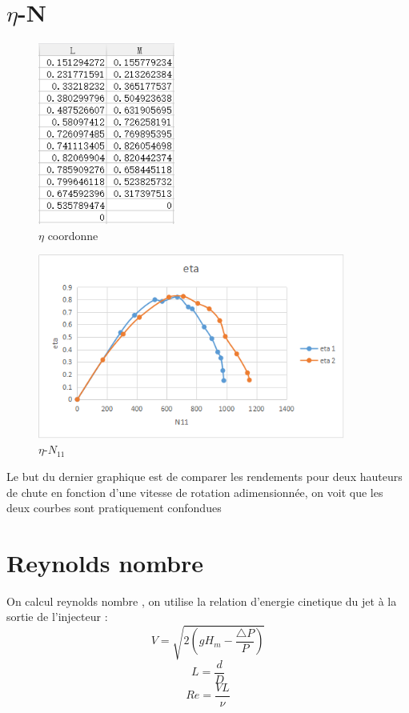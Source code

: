 \documentclass[a4paper,10pt]{report} %
\begin{document}
\section{$\eta$-N}
\begin{figure}[h!]
\centering
\includegraphics[width=0.4\textwidth]{fig/figure11.png}
\caption{$\eta$ coordonne}
\end{figure}\begin{figure}[h!]
\centering
\includegraphics[width=0.9\textwidth]{fig/figure12.png}
\caption{$\eta$-$N_{11}$}
\end{figure}
Le but du dernier graphique est de comparer les rendements pour deux hauteurs de chute en fonction d'une vitesse de rotation adimensionnée, on voit que les deux courbes sont pratiquement confondues



\section{Reynolds nombre}
On calcul reynolds  nombre , on utilise la relation d'energie cinetique du jet à la sortie de l'injecteur :
$$V=\sqrt{2(gH_m-\frac{\triangle P}{P})}$$
$$L=\frac{d}{D}$$
$$Re=\frac{VL}{\nu}$$
\end{document}
